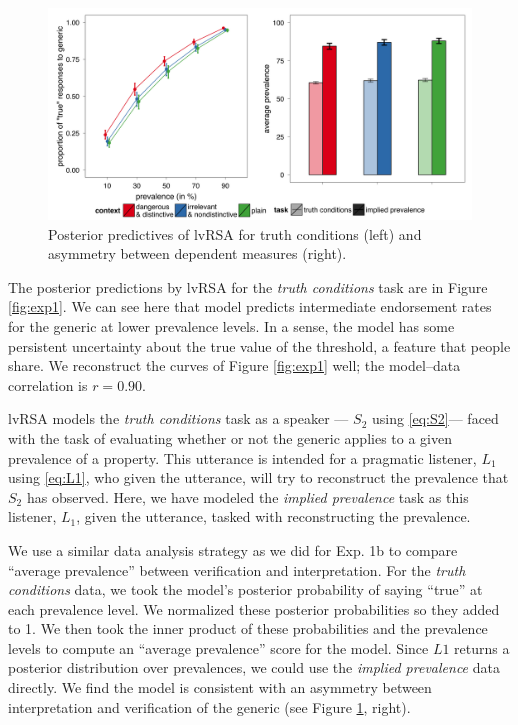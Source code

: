\documentclass[10pt,letterpaper]{article}
\begin{document}
\begin{figure}
\centering
    \includegraphics[width=\columnwidth]{lvRSA_postpreds}
    \caption{Posterior predictives of lvRSA for truth conditions (left) and asymmetry between dependent measures (right).}
  \label{fig:lvRSAposteriorpred}
\end{figure}


The posterior predictions by lvRSA for the \emph{truth conditions} task are in Figure \ref{fig:exp1}. We can see here that model predicts intermediate endorsement rates for the generic at lower prevalence levels. In a sense, the model has some persistent uncertainty about the true value of the threshold, a feature that people share. We reconstruct the curves of Figure \ref{fig:exp1} well; the model--data correlation is $r = 0.90$.

lvRSA models the \emph{truth conditions} task as a speaker --- $S_{2}$ using \eqref{eq:S2}--- faced with the task of evaluating whether or not the generic applies to a given prevalence of a property. This utterance is intended for a pragmatic listener, $L_{1}$ using \eqref{eq:L1}, who given the utterance, will try to reconstruct the prevalence that $S_{2}$ has observed. Here, we have modeled the \emph{implied prevalence} task as this listener, $L_{1}$, given the utterance, tasked with reconstructing the prevalence. 

We use a similar data analysis strategy as we did for Exp. 1b to compare ``average prevalence'' between verification and interpretation. For the \emph{truth conditions} data, we took the model's posterior probability of saying ``true'' at each prevalence level. We normalized these posterior probabilities so they added to 1. We then took the inner product of these probabilities and the prevalence levels to compute an ``average prevalence'' score for the model. Since $L1$ returns a posterior distribution over prevalences, we could use the \emph{implied prevalence} data directly. We find the model is consistent with an asymmetry between interpretation and verification of the generic (see Figure \ref{fig:lvRSAposteriorpred}, right).
\end{document}

